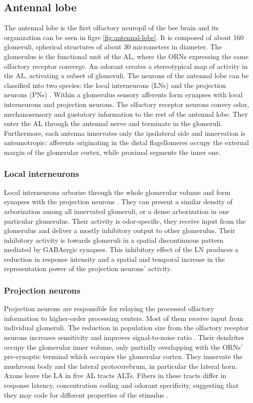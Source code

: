   \subsection{Antennal lobe}
  The antennal lobe is the first olfactory neuropil of the bee brain and its organization can be seen in figre \ref{fig:antennal-lobe}.
  It is composed of about 160 glomeruli, spherical structures of about 30 micrometers in diameter.
  The glomerulus is the functional unit of the AL, where the ORNs expressing the same olfactory receptor converge.
  An odorant creates a stereotypical map of activity in the AL, activating a subset of glomeruli.
  The neurons of the antennal lobe can be classified into two species: the local interneurons (LNs) and the projection neurons (PNs) \cite{bee-atlas}.
  Within a glomerulus sensory afferents form synapses with local interneurons and projection neurons.
  The olfactory receptor neurons convey odor, mechanosensory and gustatory information to the rest of the antennal lobe.
  They enter the AL through the antennal nerve and terminate in the glomeruli.
  Furthermore, each antenna innervates only the ipsilateral side and innervation is antennotropic: afferents originating in the distal flagellomeres occupy the external margin of the glomerular cortex, while proximal segments the inner one.

    \subsubsection{Local interneurons}
    Local interneurons arborize through the whole glomerular volume and form synapses with the projection neurons \cite{local-neurons}.
    They can present a similar density of arborization among all innervated glomeruli, or a dense arborization in one particular glomerulus.
    Their activity is odor-specific, they receive input from the glomerulus and deliver a mostly inhibitory output to other glomerulus.
    Their inhibitory activity is towards glomeruli in a spatial discontinuous pattern mediated by GABAergic synapses.
    This inhibitory effect of the LN produces a reduction in response intensity and a spatial and temporal increase in the representation power of the projection neurons' activity.

    \subsubsection{Projection neurons}
    Projection neurons are responsible for relaying the processed olfactory information to higher-order processing centers.
    Most of them receive input from individual glomeruli.
    The reduction in population size from the olfactory receptor neurons increases sensitivity and improves signal-to-noise ratio \cite{noise-in-pn}.
    Their dendrites occupy the glomerular inner volume, only partially overlapping with the ORNs' pre-synaptic terminal which occupies the glomerular cortex.
    They innervate the mushroom body and the lateral protocerebrum, in particular the lateral horn.
    Axons leave the LA in five AL tracts ALTs.
    Fibers in these tracts differ in response latency, concentration coding and odorant specificity, suggesting that they may code for different properties of the stimulus \cite{pn-coding}.

